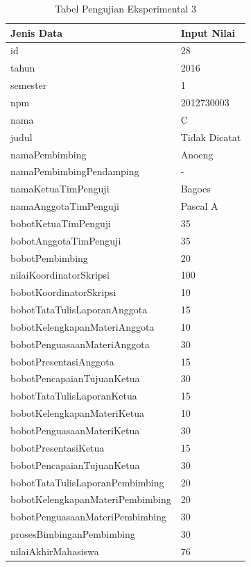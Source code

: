 	\begin{table}[H]
		\centering
		\caption{Tabel Pengujian Eksperimental 3}
		\begin{tabular}{| m{7cm} | m{5cm} |}
			\hline
			Jenis Data & Input Nilai\\
			\hline
			id & 28\\
			\hline
			tahun & 2016\\
			\hline
			semester & 1\\
			\hline
			npm & 2012730003\\
			\hline
			nama & C\\
			\hline
			judul & Tidak Dicatat \\
			\hline
			namaPembimbing & Anoeng\\
			\hline
			namaPembimbingPendamping & -\\
			\hline
			namaKetuaTimPenguji & Bagoes\\
			\hline
			namaAnggotaTimPenguji & Pascal A\\
			\hline
			bobotKetuaTimPenguji & 35\\
			\hline
			bobotAnggotaTimPenguji & 35\\
			\hline
			bobotPembimbing & 20\\
			\hline
			nilaiKoordinatorSkripsi & 100\\
			\hline
			bobotKoordinatorSkripsi & 10\\
			\hline
			bobotTataTulisLaporanAnggota & 15\\
			\hline
			bobotKelengkapanMateriAnggota & 10\\
			\hline
			bobotPenguasaanMateriAnggota & 30\\
			\hline
			bobotPresentasiAnggota & 15\\
			\hline
			bobotPencapaianTujuanKetua & 30\\
			\hline
			bobotTataTulisLaporanKetua & 15\\
			\hline
			bobotKelengkapanMateriKetua & 10\\
			\hline
			bobotPenguasaanMateriKetua & 30\\
			\hline
			bobotPresentasiKetua & 15\\
			\hline
			bobotPencapaianTujuanKetua & 30\\
			\hline
			bobotTataTulisLaporanPembimbing & 20\\
			\hline
			bobotKelengkapanMateriPembimbing &20\\
			\hline
			bobotPenguasaanMateriPembimbing & 30\\
			\hline
			prosesBimbinganPembimbing & 30\\
			\hline
			nilaiAkhirMahasiswa & 76\\
			\hline
		\end{tabular}
	\end{table}

